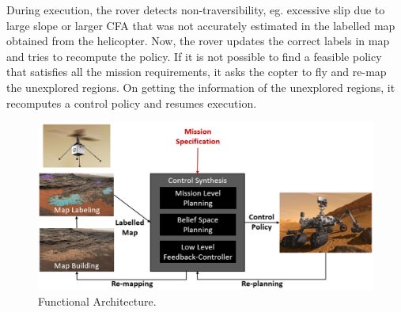\documentclass[conference]{IEEEtran}
\begin{document}
	During execution, the rover detects non-traversibility, eg. excessive slip due to large slope or larger CFA that was not accurately estimated in the labelled map obtained from the helicopter. Now, the rover updates the correct labels in map and tries to recompute the policy. If it is not possible to find a feasible policy that satisfies all the mission requirements, it asks the copter to fly and re-map the unexplored regions. On getting the information of the unexplored regions, it recomputes a control policy and resumes execution.
    	\begin{figure}[h!]
    	\centering
    	\includegraphics[width=\columnwidth]{figs/FunctionalArcV3.png}
    	\caption{Functional Architecture.}
    	\label{fig:FuncArc}
    \end{figure}
	
\end{document}
